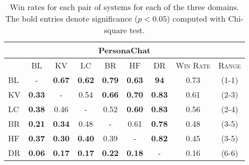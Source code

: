 \begin{table}[h!]
{\begin{tabular}{l|cccccc|cc}
\multicolumn{9}{c}{PersonaChat} \\
\toprule
\textsc{} & \textsc{BL}& \textsc{KV} &  \textsc{LC} &  \textsc{BR} & \textsc{HF}  & \textsc{DR} &\textsc{Win Rate} & \textsc{Range}\\
\hline 
\textsc{BL}& -             & \textbf{0.67} & \textbf{0.62} & \textbf{0.79} & \textbf{0.63} & \textbf{94}   &  0.73    & (1-1) \\
\textsc{KV}& \textbf{0.33} & -             & 0.54          & \textbf{0.66} & \textbf{0.70} & \textbf{0.83} & 0.61     & (2-3)\\
\textsc{LC}& \textbf{0.38} & 0.46          & -             & 0.52          & \textbf{0.60} & \textbf{0.83} & 0.56     & (2-4)\\
\textsc{BR}& \textbf{0.21} & \textbf{0.34} & 0.48          & -             & 0.61          & \textbf{0.78} & 0.48     & (3-5)\\
\textsc{HF}& \textbf{0.37} & \textbf{0.30} & \textbf{0.40} & 0.39          & -             & \textbf{0.82} & 0.45     & (3-5) \\
\textsc{DR}& \textbf{0.06} & \textbf{0.17} & \textbf{0.17} & \textbf{0.22} & \textbf{0.18} & -             & 0.16     & (6-6) \\
\bottomrule
\end{tabular}
}
\caption{Win rates for each pair of systems for each of the three domains. The bold entries denote significance ($p < 0.05$) computed with Chi-square test.}
\label{tab:fl-win-rates}
\end{table}